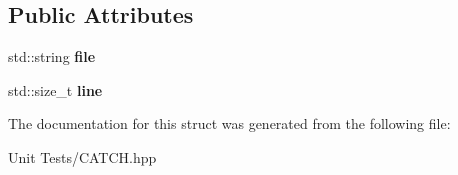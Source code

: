 \subsection*{Public Attributes}
\begin{DoxyCompactItemize}
\item 
std\+::string {\bfseries file}\hypertarget{structCatch_1_1SourceLineInfo_adf3ccf0c2bd326eb3466318af82a94dd}{}\label{structCatch_1_1SourceLineInfo_adf3ccf0c2bd326eb3466318af82a94dd}

\item 
std\+::size\+\_\+t {\bfseries line}\hypertarget{structCatch_1_1SourceLineInfo_a841e5d696c7b9cde24e45e61dd979c77}{}\label{structCatch_1_1SourceLineInfo_a841e5d696c7b9cde24e45e61dd979c77}

\end{DoxyCompactItemize}


The documentation for this struct was generated from the following file\+:\begin{DoxyCompactItemize}
\item 
Unit Tests/C\+A\+T\+C\+H.\+hpp\end{DoxyCompactItemize}
